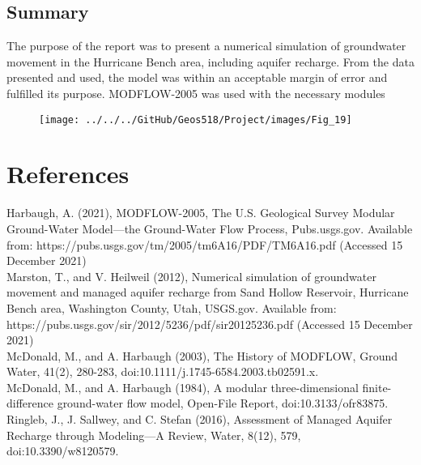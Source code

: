 \documentclass[]{report}
\begin{document}
\section{Summary}
The purpose of the report was to present a numerical simulation of groundwater movement in the Hurricane Bench area, including aquifer recharge. From the data presented and used, the model was within an acceptable margin of error and fulfilled its purpose. MODFLOW-2005 was used with the necessary modules
\begin{figure}[h]
	\centering
	\texttt{[image: ../../../GitHub/Geos518/Project/images/Fig\_19]}
\end{figure}






\chapter{References}
Harbaugh, A. (2021), MODFLOW-2005, The U.S. Geological Survey Modular Ground-Water Model—the Ground-Water Flow Process, Pubs.usgs.gov. Available from: https://pubs.usgs.gov/tm/2005/tm6A16/PDF/TM6A16.pdf (Accessed 15 December 2021)\\

Marston, T., and V. Heilweil (2012), Numerical simulation of groundwater movement and managed aquifer recharge from Sand Hollow Reservoir, Hurricane Bench area, Washington County, Utah, USGS.gov. Available from: https://pubs.usgs.gov/sir/2012/5236/pdf/sir20125236.pdf (Accessed 15 December 2021)\\

McDonald, M., and A. Harbaugh (2003), The History of MODFLOW, Ground Water, 41(2), 280-283, doi:10.1111/j.1745-6584.2003.tb02591.x.\\

McDonald, M., and A. Harbaugh (1984), A modular three-dimensional finite-difference ground-water flow model, Open-File Report, doi:10.3133/ofr83875.\\

Ringleb, J., J. Sallwey, and C. Stefan (2016), Assessment of Managed Aquifer Recharge through Modeling—A Review, Water, 8(12), 579, doi:10.3390/w8120579.\\
\end{document}
